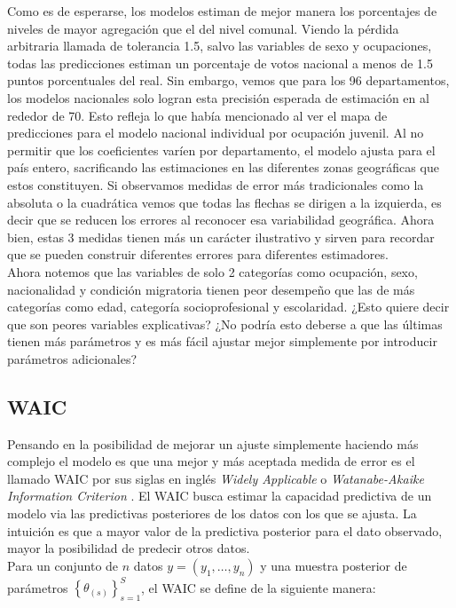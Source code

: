 Como es de esperarse, los modelos estiman de mejor manera los porcentajes de niveles de mayor agregación que el del nivel comunal. Viendo la pérdida arbitraria llamada de tolerancia 1.5, salvo las variables de sexo y ocupaciones, todas las predicciones estiman un porcentaje de votos nacional a menos de 1.5 puntos porcentuales del real. Sin embargo, vemos que para los 96 departamentos, los modelos nacionales solo logran esta precisión esperada de estimación en al rededor de 70. Esto refleja lo que había mencionado al ver el mapa de predicciones para el modelo nacional individual por ocupación juvenil. Al no permitir que los coeficientes varíen por departamento, el modelo ajusta para el país entero, sacrificando las estimaciones en las diferentes zonas geográficas que estos constituyen. Si observamos medidas de error más tradicionales como la absoluta o la cuadrática vemos que todas las flechas se dirigen a la izquierda, es decir que se reducen los errores al reconocer esa variabilidad geográfica. Ahora bien, estas 3 medidas tienen más un carácter ilustrativo y sirven para recordar que se pueden construir diferentes errores para diferentes estimadores.\\ 

Ahora notemos que las variables de solo 2 categorías como ocupación, sexo, nacionalidad y condición migratoria tienen peor desempeño que las de más categorías como edad, categoría socioprofesional y escolaridad. ¿Esto quiere decir que son peores variables explicativas? ¿No podría esto deberse a que las últimas tienen más parámetros y es más fácil ajustar mejor simplemente por introducir parámetros adicionales?\\

\subsection{WAIC}

Pensando en la posibilidad de mejorar un ajuste simplemente haciendo más complejo el modelo es que una mejor y más aceptada medida de error es el llamado WAIC por sus siglas en inglés \textit{Widely Applicable} o \textit{Watanabe-Akaike Information Criterion} \parencite{Vehtari16}. El WAIC busca estimar la capacidad predictiva de un modelo via las predictivas posteriores de los datos con los que se ajusta. La intuición es que a mayor valor de la predictiva posterior para el dato observado, mayor la posibilidad de predecir otros datos.\\ 

Para un conjunto de $n$ datos $y=(y_1,\dots,y_n)$ y una muestra posterior de parámetros $\left\lbrace\theta_{(s)}\right\rbrace_{s=1}^S$, el WAIC se define de la siguiente manera:

